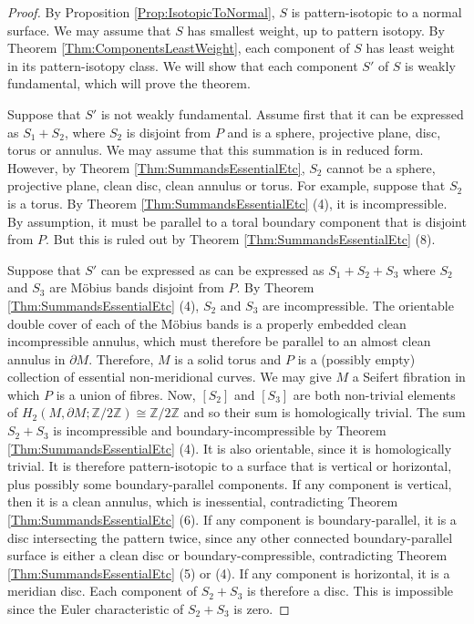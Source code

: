 \documentclass[oneside]{amsart}
\numberwithin{equation}{section}
\theoremstyle{plain}
\theoremstyle{definition}
\begin{document}
\begin{proof}
By Proposition \ref{Prop:IsotopicToNormal}, $S$ is pattern-isotopic to a normal surface. 
We may assume that $S$ has smallest weight, up to pattern isotopy. By Theorem \ref{Thm:ComponentsLeastWeight},
each component of $S$ has least weight in its pattern-isotopy class.
We will show that each component $S'$ of $S$ is weakly fundamental, which will prove the theorem.

Suppose that $S'$ is not weakly fundamental. Assume first that it can be expressed as $S_1 + S_2$,
where $S_2$ is disjoint from $P$ and is a sphere, projective plane, disc, torus or annulus. We may
assume that this summation is in reduced form. However, by Theorem \ref{Thm:SummandsEssentialEtc},
$S_2$ cannot be a sphere, projective plane, clean disc, clean annulus or torus. For example, suppose that
$S_2$ is a torus. By Theorem \ref{Thm:SummandsEssentialEtc} (4), it is incompressible. By assumption, it must be
parallel to a toral boundary component that is disjoint from $P$.
But this is ruled out by Theorem \ref{Thm:SummandsEssentialEtc} (8).



Suppose that $S'$ can be expressed as can be expressed as $S_1 + S_2 + S_3$ where $S_2$
and $S_3$ are M\"obius bands disjoint from $P$. By Theorem \ref{Thm:SummandsEssentialEtc} (4),
$S_2$ and $S_3$ are incompressible. The orientable double cover of each of the M\"obius bands is a properly embedded
clean incompressible annulus, which must therefore be parallel to an almost clean annulus in $\partial M$. 
Therefore, $M$ is a solid torus and $P$ is a (possibly empty) collection of essential non-meridional curves.
We may give $M$ a Seifert fibration in which $P$ is a union of fibres.
Now, $[S_2]$ and $[S_3]$ are both non-trivial elements of $H_2(M, \partial M; \mathbb{Z}/2\mathbb{Z}) \cong \mathbb{Z}/2\mathbb{Z}$ 
and so their sum is homologically trivial. The sum $S_2 + S_3$ is incompressible and boundary-incompressible
by Theorem \ref{Thm:SummandsEssentialEtc} (4). It is also orientable, since it is homologically
trivial. It is therefore pattern-isotopic to a surface that is vertical or horizontal, plus possibly some boundary-parallel
components. If any component is vertical, then it is a
clean annulus, which is inessential, contradicting Theorem \ref{Thm:SummandsEssentialEtc} (6). 
If any component is boundary-parallel, it is a disc intersecting the pattern twice, since
any other connected boundary-parallel surface is either a clean disc or boundary-compressible,
contradicting Theorem \ref{Thm:SummandsEssentialEtc} (5) or (4). If any component is horizontal, it
is a meridian disc. Each component of $S_2 + S_3$ is therefore a disc. This is impossible since the Euler characteristic of $S_2 + S_3$ is zero.
\end{proof}
\end{document}
